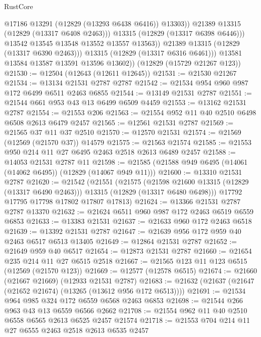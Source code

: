 \begin{lexlean}{RustCore}
\begin{coremodule}
                        @17186
                        @13291
                        (@12829 (@13293 @6438 @6416))
                        @13303))
                    @21389
                    @13315
                    (@12829 (@13317 @6408 @2463)))
                  @13315
                  (@12829 (@13317 @6398 @6446)))
                @13542
                @13545
                @13548
                @13552
                @13557
                @13563))
            @21389
            @13315
            (@12829 (@13317 @6390 @2463)))
          @13315
          (@12829 (@13317 @6316 @6461)))
        @13581
        @13584
        @13587
        @13591
        @13596
        @13602))
    (@12829 (@15729 @21267 @123))
@21530 := @12504 (@12643 (@12611 @12645))
@21531 := @21530 @21267
@21534 := @13134 @21531 @2787 @2787
@21542 := @21534 @954 @960 @987 @172 @6499 @6511 @2463 @6855
@21544 := @13149 @21531 @2787
@21551 := @21544 @661 @953 @43 @13 @6499 @6509 @4459
@21553 := @13162 @21531 @2787
@21554 := @21553 @206
@21563 := @21554 @952 @11 @40 @2510 @6498 @6508 @2613 @6479 @2457
@21565 := @12561 @21531 @2787
@21569 := @21565 @37 @11 @37 @2510
@21570 := @12570 @21531
@21574 := @21569 (@12569 (@21570 @37)) @14579
@21575 := @21563 @21574
@21585 := @21553 @950 @214 @11 @27 @6495 @2463 @2518 @2613 @6489 @2457
@21588 := @14053 @21531 @2787 @11
@21598 := @21585 (@21588 @949 @6495 (@14061 (@14062 @6495)) (@12829 (@14067 @949 @11)))
@21600 := @13310 @21531 @2787
@21620 := @21542
    (@21551
      (@21575
        (@21598 @21600 @13315 (@12829 (@13317 @6490 @2463)))
        @13315
        (@12829 (@13317 @6480 @6498)))
      @17792
      @17795
      @17798
      @17802
      @17807
      @17813)
@21624 := @13366 @21531 @2787 @2787 @13370
@21632 := @21624 @6511 @960 @987 @172 @2463 @6519 @6559 @6853
@21633 := @13383 @21531
@21637 := @21633 @960 @172 @2463 @6518
@21639 := @13392 @21531 @2787
@21647 := @21639 @956 @172 @959 @40 @2463 @6517 @6513 @13405
@21649 := @12864 @21531 @2787
@21652 := @21649 @959 @40 @6517
@21654 := @12873 @21531 @2787
@21660 := @21654 @235 @214 @11 @27 @6515 @2518
@21667 := @21565 @123 @11 @123 @6515 (@12569 (@21570 @123))
@21669 := @12577 (@12578 @6515)
@21674 := @21660 (@21667 @21669) (@12933 @21531 @2787)
@21683 := @21632 (@21637 (@21647 (@21652 @21674) (@13265 (@13612 @956 @172 @6513))))
@21691 := @21534 @964 @985 @324 @172 @6559 @6568 @2463 @6853
@21698 := @21544 @266 @963 @43 @13 @6559 @6566 @2662
@21708 := @21554 @962 @11 @40 @2510 @6558 @6565 @2613 @6525 @2457 @21574
@21718 := @21553 @704 @214 @11 @27 @6555 @2463 @2518 @2613 @6535 @2457

\end{coremodule}
\end{lexlean}
